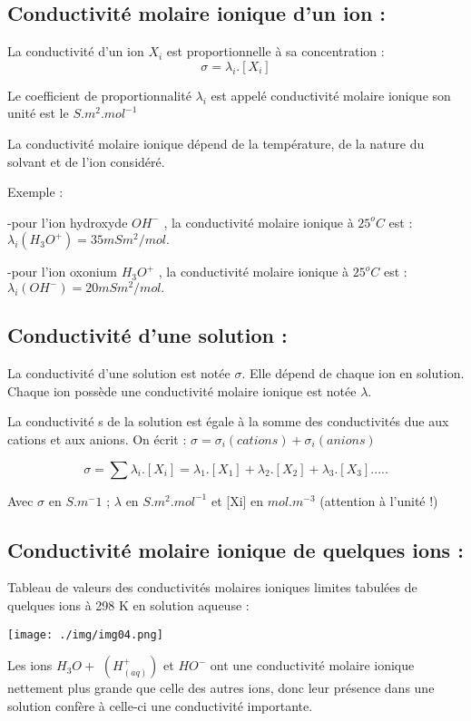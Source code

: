 \documentclass[12pt]{article}
\begin{document}
\subsection{Conductivité molaire ionique d’un ion :}
La conductivité d’un ion $X_i$ est proportionnelle à sa concentration : $$\sigma = \lambda_i . [X_i]$$

Le coefficient de proportionnalité $\lambda_i$ est appelé conductivité molaire ionique son unité est le   $S.m^2.mol^{-1}$

La conductivité molaire ionique dépend de la température, de la nature du solvant et de l’ion considéré.

\vspace{0.2cm}

Exemple : 

-pour l’ion hydroxyde  $OH^-$ , la conductivité molaire ionique à $25^oC$ est :$\lambda_i(H_3O^+)= 35 mSm^2/mol. $


-pour l’ion oxonium $H_3O^+$ , la conductivité molaire ionique à $25^oC$ est :$\lambda_i(OH^-)= 20 mSm^2/mol. $


\subsection{ Conductivité d’une solution : }
La conductivité d’une solution est notée $\sigma$. Elle dépend de chaque ion en solution.
Chaque ion possède une conductivité molaire ionique est notée $\lambda$.

La conductivité s de la solution est égale à la somme des conductivités due aux cations et aux anions. On
écrit : $\sigma = \sigma_i(cations) + \sigma_i(anions) $

$$\sigma = \sum \lambda_i.[X_i] = \lambda_1.[X_1] + \lambda_2.[X_2] + \lambda_3.[X_3] .....$$

Avec $\sigma$ en $S.m^-1$ ; $\lambda$ en $S.m^2.mol^{-1}$ et [Xi] en $mol.m^{-3}$ (attention à l’unité !)

\subsection{Conductivité molaire ionique de quelques ions : }
Tableau de valeurs des conductivités molaires ioniques limites tabulées de quelques ions à 298 K en solution
aqueuse :

\begin{center}
\texttt{[image: ./img/img04.png]}
\end{center}

Les ions $H_3O+$ $(H^+_{(aq)})$ et $HO^-$ ont une conductivité molaire ionique nettement plus grande que celle des autres
ions, donc leur présence dans une solution confère à celle-ci une conductivité importante.
\end{document}
